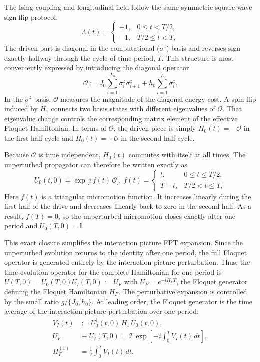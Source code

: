 \documentclass[aps,prb,reprint,twocolumn,amsmath,amssymb,citeautoscript]{revtex4-2}
\begin{document}
The Ising coupling and longitudinal field follow the same symmetric
square-wave sign-flip protocol:
\begin{equation}
\Lambda(t)=
\begin{cases}
+1, & 0\le t<T/2,\\
-1, & T/2\le t<T,
\end{cases}
\label{eq:model_drive}
\end{equation}
The driven part is diagonal in the computational ($\sigma^z$) basis and
reverses sign exactly halfway through the cycle of time period, $T$. This structure is most
conveniently expressed by introducing the diagonal operator
\begin{equation}
\mathcal{O}:=
J_0\sum_{i=1}^{L_b}\sigma_i^z\sigma_{i+1}^z
+h_0\sum_{i=1}^{L}\sigma_i^z.
\label{eq:model_O}
\end{equation}
In the $\sigma^z$ basis, $\mathcal{O}$ measures the magnitude of the diagonal energy cost.
A spin flip induced by $H_1$ connects two basis states with different
eigenvalues of $\mathcal{O}$. That eigenvalue change controls the
corresponding matrix element of the effective Floquet Hamiltonian. In
terms of $\mathcal{O}$, the driven piece is simply $H_0(t)=-\mathcal{O}$
in the first half-cycle and $H_0(t)=+\mathcal{O}$ in the second
half-cycle.

Because $\mathcal{O}$ is time independent, $H_0(t)$ commutes with itself
at all times. The unperturbed propagator can therefore be written
exactly as
\begin{equation}
U_0(t,0)=\exp\!\bigl[i\,f(t)\,\mathcal{O}\bigr],~
f(t)=
\begin{cases}
t, & 0\le t\le T/2,\\
T-t, & T/2<t\le T,
\end{cases}
\label{eq:model_U0}
\end{equation}
Here $f(t)$ is a triangular micromotion function. It increases linearly
during the first half of the drive and decreases linearly back to zero in
the second half. As a result, $f(T)=0$, so the unperturbed micromotion
closes exactly after one period and $U_0(T,0)=\mathbb{I}$.

This exact closure simplifies the interaction picture FPT expansion. Since the unperturbed evolution returns to the identity after one period, the full
Floquet operator is generated entirely by the interaction-picture
perturbation. Thus, the time-evolution operator for the complete Hamiltonian  for one period is $U(T,0)=U_{0}(T,0)U_I(T,0):=U_F$ with $U_F=e^{-iH_FT}$, the Floquet generator defining the Floquet Hamiltonian
$H_F$. The perturbative expansion is controlled by the small ratio
$g/\{J_0,h_0\}$. At leading order, the Floquet generator is the time
average of the interaction-picture perturbation over one period:
\begin{equation}
    \begin{aligned}
V_I(t)&:=U_0^\dagger(t,0)\,H_1\,U_0(t,0),\\ \nonumber
U_F&\equiv U_{I}(T,0)
=\mathcal{T}\exp\!\left[-i\int_0^T V_I(t)\,dt\right],\\ \nonumber
H_F^{(1)}&=\frac{1}{T}\int_0^T V_I(t)\,dt,
\label{eq:model_Floquet}
\end{aligned}
\end{equation}
\end{document}
